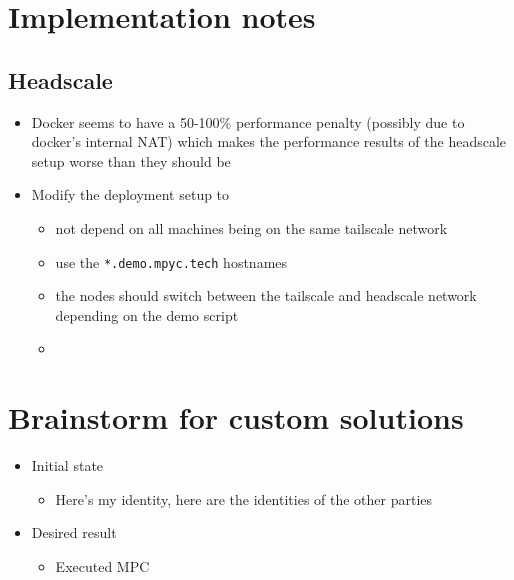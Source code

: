 \hypertarget{implementation-notes}{%
\chapter{Implementation notes}\label{implementation-notes}}

\hypertarget{headscale}{%
\section{Headscale}\label{headscale}}

\begin{itemize}
\tightlist
\item
  Docker seems to have a 50-100\% performance penalty (possibly due to
  docker's internal NAT) which makes the performance results of the
  headscale setup worse than they should be
\item
  Modify the deployment setup to

  \begin{itemize}
  \tightlist
  \item
    not depend on all machines being on the same tailscale network
  \item
    use the \texttt{*.demo.mpyc.tech} hostnames
  \item
    the nodes should switch between the tailscale and headscale network
    depending on the demo script
  \item
  \end{itemize}
\end{itemize}

\hypertarget{brainstorm-for-custom-solutions}{%
\chapter{Brainstorm for custom
solutions}\label{brainstorm-for-custom-solutions}}

\begin{itemize}
\tightlist
\item
  Initial state

  \begin{itemize}
  \tightlist
  \item
    Here's my identity, here are the identities of the other parties
  \end{itemize}
\item
  Desired result

  \begin{itemize}
  \tightlist
  \item
    Executed MPC
  \end{itemize}
\end{itemize}


